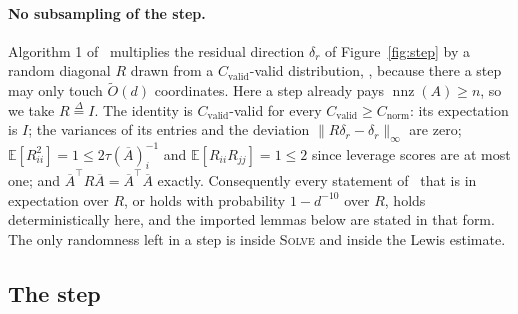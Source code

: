 \documentclass[11pt]{article}
\newcommand{\nnz}{\operatorname{nnz}}
\renewcommand{\O}{\widetilde O}
\newcommand{\defeq}{\stackrel{\Delta}{=}}
\newcommand{\Cnorm}{C_{\mathrm{norm}}}
\newcommand{\Cvalid}{C_{\mathrm{valid}}}
\newcommand{\E}{\mathbb E}
\begin{document}
\paragraph{No subsampling of the step.}
Algorithm 1 of~\cite{BLLSSSW21} multiplies the
residual direction $\delta_r$ of Figure~\ref{fig:step} by a random diagonal
$R$ drawn from a
$\Cvalid$-valid distribution, \cite[Definition
4.13]{BLLSSSW21}, because there a step may
only touch $\O(d)$ coordinates.
Here a step already pays $\nnz(A) \ge n$, so we take
$R \defeq I$.
The identity is $\Cvalid$-valid for every
$\Cvalid \ge \Cnorm$: its expectation is
$I$; the variances of its entries and the deviation
$\|R \delta_r - \delta_r\|_{\infty}$ are zero;
$\E[R_{ii}^{2}] = 1 \le 2 \tau(\overline{A})_i^{-1}$ and
$\E[R_{ii} R_{jj}] = 1 \le 2$ since leverage scores are at most one; and
$\overline{A}^\top R \overline{A} = \overline{A}^\top \overline{A}$ exactly.
Consequently every statement
of~\cite{BLLSSSW21} that is in expectation
over $R$, or holds with probability
$1 - d^{-10}$ over
$R$, holds deterministically here, and the imported lemmas below are stated in
that form.
The only randomness left in a step is inside \textsc{Solve} and inside the Lewis
estimate.

\subsection{The step}
\end{document}
